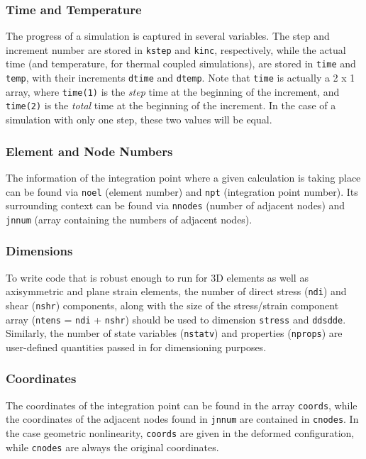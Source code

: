 \documentclass[10pt,letterpaper,oneside]{report}
\begin{document}
\subsubsection{Time and Temperature}
The progress of a simulation is captured in several variables.  The step and increment number are stored in \texttt{kstep} and \texttt{kinc}, respectively, while the actual time (and temperature, for thermal coupled simulations), are stored in \texttt{time} and \texttt{temp}, with their increments \texttt{dtime} and \texttt{dtemp}.  Note that \texttt{time} is actually a 2 x 1 array, where \texttt{time(1)} is the \emph{step} time at the beginning of the increment, and \texttt{time(2)} is the \emph{total} time at the beginning of the increment.  In the case of a simulation with only one step, these two values will be equal. 

\subsubsection{Element and Node Numbers}
The information of the integration point where a given calculation is taking place can be found via \texttt{noel} (element number) and \texttt{npt} (integration point number).  Its surrounding context can be found via \texttt{nnodes} (number of adjacent nodes) and \texttt{jnnum} (array containing the numbers of adjacent nodes). 

\subsubsection{Dimensions}
To write code that is robust enough to run for 3D elements as well as axisymmetric and plane strain elements, the number of direct stress (\texttt{ndi}) and shear (\texttt{nshr}) components, along with the size of the stress/strain component array (\texttt{ntens} = \texttt{ndi} + \texttt{nshr}) should be used to dimension \texttt{stress} and \texttt{ddsdde}.  Similarly, the number of state variables (\texttt{nstatv}) and properties (\texttt{nprops}) are user-defined quantities passed in for dimensioning purposes.  

\subsubsection{Coordinates}
The coordinates of the integration point can be found in the array \texttt{coords}, while the coordinates of the adjacent nodes found in \texttt{jnnum} are contained in \texttt{cnodes}.  In the case geometric nonlinearity, \texttt{coords} are given in the deformed configuration, while \texttt{cnodes} are always the original coordinates.  
\end{document}
